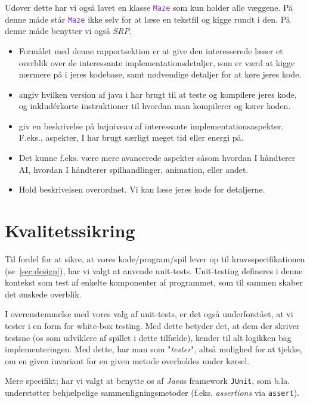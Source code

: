 \documentclass{article}
\newcommand{\code}[1]{\small\texttt{#1}}
\newcommand{\class}[1]{\textcolor{BlueViolet}{\small\texttt{#1}}}
\theoremstyle{mytheoremstyle}
\theoremstyle{mytheoremstyle}
\theoremstyle{myproblemstyle}
\begin{document}
Udover dette har vi også lavet en klasse \class{Maze} som kun holder alle
væggene. På denne måde står \class{Maze} ikke selv for at læse en tekstfil og
kigge rundt i den. På denne måde benytter vi også \textit{SRP}.

\begin{itemize}
  \item Formålet med denne rapportsektion er at give den interesserede læser et
  overblik over de interessante implementationsdetaljer, som er værd at kigge
  nærmere på i jeres kodebase, samt nødvendige detaljer for at køre jeres kode.
  \item angiv hvilken version af java i har brugt til at teste og kompilere
  jeres kode, og inkludérkorte instruktioner til hvordan man kompilerer og kører
  koden.
  \item giv en beskrivelse på højniveau af interessante implementationsaspekter.
  F.eks., aspekter, I har brugt særligt meget tid eller energi på.
  \item Det kunne f.eks. være mere avancerede aspekter såsom hvordan I håndterer
  AI, hvordan I håndterer spilhandlinger, animation, eller andet.
  \item Hold beskrivelsen overordnet. Vi kan læse jeres kode for detaljerne.
\end{itemize}

\newpage
\section{Kvalitetssikring}\label{sec:Kvalitetssikring} %
Til fordel for at sikre, at vores kode/program/spil lever op til
kravsspecifikationen (se \autoref{sec:design}), har vi valgt at anvende
unit-tests. Unit-testing defineres i denne kontekst som test af enkelte
komponenter af programmet, som til sammen skaber det ønskede overblik.

I overenstemmelse med vores valg af unit-tests, er det også underforstået, at vi
tester i en form for white-box testing. Med dette betyder det, at dem der
skriver testsne (os som udviklere af spillet i dette tilfælde), kender til alt
logikken bag implementeringen. Med dette, har man som "\textit{tester}", altså
mulighed for at tjekke, om en given invariant for en given metode overholdes
under kørsel.

Mere specifikt; har vi valgt at benytte os af \textit{Java}s framework
\code{JUnit}, som b.la. understøtter behjælpelige sammenligningsmetoder (f.eks.
\textit{assertions} via \code{assert}).
\end{document}
